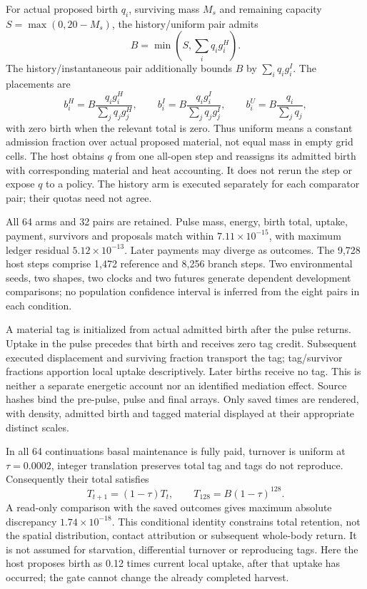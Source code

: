 For actual proposed birth $q_i$, surviving mass $M_s$ and remaining capacity $S=\max(0,20-M_s)$, the history/uniform pair admits
\[
 B=\min(S,\sum_i q_i g_i^{H}).
\]
The history/instantaneous pair additionally bounds $B$ by $\sum_iq_i g_i^{I}$. The placements are
\[
 b_i^{H}=B\frac{q_i g_i^{H}}{\sum_jq_jg_j^{H}},\qquad
 b_i^{I}=B\frac{q_i g_i^{I}}{\sum_jq_jg_j^{I}},\qquad
 b_i^{U}=B\frac{q_i}{\sum_jq_j},
\]
with zero birth when the relevant total is zero. Thus uniform means a constant admission fraction over actual proposed material, not equal mass in empty grid cells. The host obtains $q$ from one all-open step and reassigns its admitted birth with corresponding material and heat accounting. It does not rerun the step or expose $q$ to a policy. The history arm is executed separately for each comparator pair; their quotas need not agree.

All 64 arms and 32 pairs are retained. Pulse mass, energy, birth total, uptake, payment, survivors and proposals match within $7.11\times10^{-15}$, with maximum ledger residual $5.12\times10^{-13}$. Later payments may diverge as outcomes. The 9,728 host steps comprise 1,472 reference and 8,256 branch steps. Two environmental seeds, two shapes, two clocks and two futures generate dependent development comparisons; no population confidence interval is inferred from the eight pairs in each condition.

A material tag is initialized from actual admitted birth after the pulse returns. Uptake in the pulse precedes that birth and receives zero tag credit. Subsequent executed displacement and surviving fraction transport the tag; tag/survivor fractions apportion local uptake descriptively. Later births receive no tag. This is neither a separate energetic account nor an identified mediation effect. Source hashes bind the pre-pulse, pulse and final arrays. Only saved times are rendered, with density, admitted birth and tagged material displayed at their appropriate distinct scales.

In all 64 continuations basal maintenance is fully paid, turnover is uniform at $\tau=0.0002$, integer translation preserves total tag and tags do not reproduce. Consequently their total satisfies
\[
T_{t+1}=(1-\tau)T_t,\qquad T_{128}=B(1-\tau)^{128}.
\]
A read-only comparison with the saved outcomes gives maximum absolute discrepancy $1.74\times10^{-18}$. This conditional identity constrains total retention, not the spatial distribution, contact attribution or subsequent whole-body return. It is not assumed for starvation, differential turnover or reproducing tags. Here the host proposes birth as 0.12 times current local uptake, after that uptake has occurred; the gate cannot change the already completed harvest.

